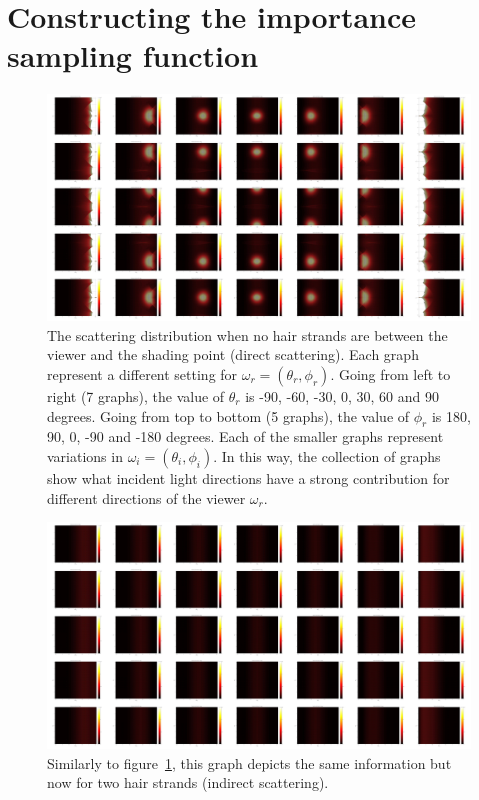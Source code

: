 \documentclass[11pt,a4paper]{report}
\begin{document}
\section{Constructing the importance sampling function}



\begin{figure}[h]
\begin{center}
\includegraphics[scale=0.04]{images/scatteringdistribution/numstrands0.jpg}
\caption{The scattering distribution when no hair strands are between the viewer and the shading point (direct scattering). Each graph represent a different setting for $\omega_r = (\theta_r, \phi_r)$. Going from left to right (7 graphs), the value of $\theta_r$ is -90, -60, -30, 0, 30, 60 and 90 degrees. Going from top to bottom (5 graphs), the value of $\phi_r$ is 180, 90, 0, -90 and -180 degrees. Each of the smaller graphs represent variations in $\omega_i = (\theta_i, \phi_i)$. In this way, the collection of graphs show what incident light directions have a strong contribution for different directions of the viewer $\omega_r$.}
\label{numstrands0}
\end{center}
\end{figure}

\begin{figure}[h]
\begin{center}
\includegraphics[scale=0.04]{images/scatteringdistribution/numstrands2.jpg}
\caption{Similarly to figure~\ref{numstrands0}, this graph depicts the same information but now for two hair strands (indirect scattering).}
\label{numstrands2}
\end{center}
\end{figure}
\end{document}
